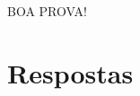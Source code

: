 \documentclass[12pt,a4paper]{article}
\begin{document}
\vfill
\begin{center}
BOA PROVA!
\end{center}

\newpage
\restoregeometry
\section*{Respostas}
\shipoutAnswer
\end{document}
